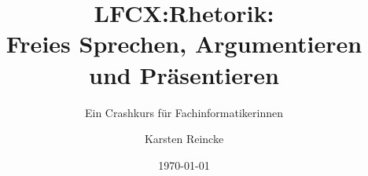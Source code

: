 \documentclass[]{beamer}
\title{LFCX:Rhetorik:\\Freies Sprechen, Argumentieren und Präsentieren}
\subtitle{Ein Crashkurs für Fachinformatikerinnen}
\institute{GS-LDK}
\author{Karsten Reincke}
\date{\today}
\def\cfgGl{../../../cfg.gl/}
\begin{document}

\begin{frame}
  \titlepage
\end{frame}






\logo{}
\newpage



%
\end{document}

